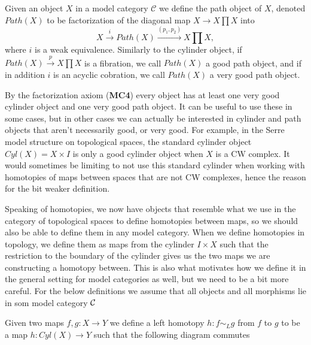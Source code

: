 \begin{definition}
Given an object $X$ in a model category $\mathcal{C}$ we define the path object of $X$, denoted $Path(X)$ to be factorization of the diagonal map $X \rightarrow X\prod X$ into
\begin{equation*}
     X \overset{i}\rightarrow Path(X) \overset{(p_1,p_2)}\rightarrow X \prod X,
\end{equation*}
where $i$ is a weak equivalence. Similarly to the cylinder object, if $Path(X)\overset{p}\rightarrow X\prod X$ is a fibration, we call $Path(X)$ a good path object, and if in addition $i$ is an acyclic cobration, we call $Path(X)$ a very good path object.
\end{definition}

By the factorization axiom (\textbf{MC4}) every object has at least one very good cylinder object and one very good path object. It can be useful to use these in some cases, but in other cases we can actually be interested in cylinder and path objects that aren't necessarily good, or very good. For example, in the Serre model structure on topological spaces, the standard cylinder object $Cyl(X)=X\times I$ is only a good cylinder object when $X$ is a CW complex. It would sometimes be limiting to not use this standard cylinder when working with homotopies of maps between spaces that are not CW complexes, hence the reason for the bit weaker definition. 

Speaking of homotopies, we now have objects that resemble what we use in the category of topological spaces to define homotopies between maps, so we should also be able to define them in any model category. When we define homotopies in topology, we define them as maps from the cylinder $I\times X$ such that the restriction to the boundary of the cylinder gives us the two maps we are constructing a homotopy between. This is also what motivates how we define it in the general setting for model categories as well, but we need to be a bit more careful. For the below definitions we assume that all objects and all morphisms lie in som model category $\mathcal{C}$

\begin{definition}
Given two maps $f,g: X\rightarrow Y$ we define a left homotopy $h:f\sim_L g$ from $f$ to $g$ to be a map $h: Cyl(X)\rightarrow Y$ such that the following diagram commutes
\begin{center}
\end{center}
\end{definition}

